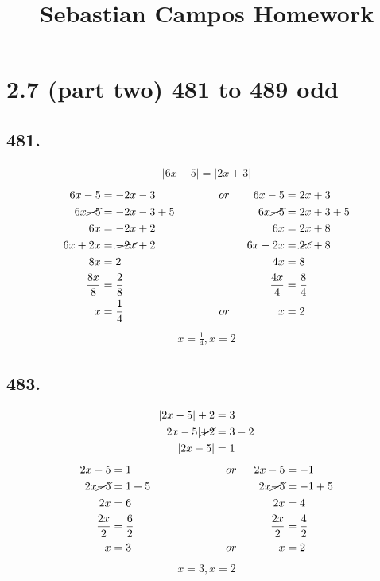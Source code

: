 \documentclass{article}
\title{Sebastian Campos Homework}
\begin{document}
    \maketitle
    \noindent
    \section*{2.7 (part two) 481 to 489 odd}
    \subsection*{481.}
        \begin{align*}|6x - 5| = |2x+ 3| \end{align*}
        \begin{align*}
            6x - 5 &= -2x -3 \hspace{2cm}or\hspace{.2cm} &6x -5 &= 2x + 3 \\
            6x \cancel{- 5} &= -2x -3 +5 &6x \cancel{-5} &= 2x + 3 + 5 \\
            6x &= -2x + 2 &6x &= 2x + 8 \\
            6x + 2x &= \cancel{-2x} + 2 &6x - 2x &= \cancel{2x} + 8 \\
            8x &= 2 &4x &= 8 \\
            \frac{8x}{8} &= \frac{2}{8} &\frac{4x}{4} &= \frac{8}{4} \\
            x &= \frac{1}{4} \hspace{3cm}or\hspace{.2cm} &x &= 2 \\
        \end{align*}
        \begin{align*}
            \boxed{x = \frac{1}{4}, x = 2}
        \end{align*}

    \subsection*{483.}
    \begin{align*}
        |2x - 5| + 2 &= 3\\
        |2x - 5| \cancel{+ 2} &= 3 - 2\\
        |2x - 5| &= 1\\
    \end{align*}
    \begin{align*}
        2x - 5 &= 1 \hspace{3cm}or\hspace{.2cm} &2x - 5 &= -1 \\
        2x \cancel{-5} &= 1 + 5 & 2x \cancel{- 5} &= -1 + 5\\
        2x &= 6 &2x &= 4 \\
        \frac{2x}{2} &= \frac{6}{2} &\frac{2x}{2} &= \frac{4}{2} \\
        x &= 3 \hspace{3cm}or\hspace{.2cm} &x &= 2 \\
    \end{align*}
    \begin{align*}
        \boxed{x = 3, x = 2}
    \end{align*}
\end{document}
